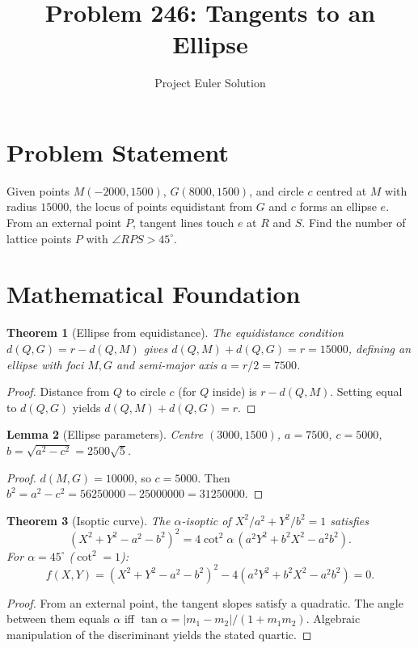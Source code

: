 \documentclass[12pt]{article}
\title{Problem 246: Tangents to an Ellipse}
\author{Project Euler Solution}
\date{}
\newtheorem{theorem}{Theorem}
\newtheorem{lemma}[theorem]{Lemma}
\begin{document}
\maketitle

\section{Problem Statement}

Given points $M(-2000,1500)$, $G(8000,1500)$, and circle $c$ centred at $M$ with radius $15000$, the locus of points equidistant from $G$ and $c$ forms an ellipse $e$. From an external point $P$, tangent lines touch $e$ at $R$ and $S$. Find the number of lattice points $P$ with $\angle RPS>45^\circ$.

\section{Mathematical Foundation}

\begin{theorem}[Ellipse from equidistance]
The equidistance condition $d(Q,G)=r-d(Q,M)$ gives $d(Q,M)+d(Q,G)=r=15000$, defining an ellipse with foci $M,G$ and semi-major axis $a=r/2=7500$.
\end{theorem}

\begin{proof}
Distance from $Q$ to circle $c$ (for $Q$ inside) is $r-d(Q,M)$. Setting equal to $d(Q,G)$ yields $d(Q,M)+d(Q,G)=r$.
\end{proof}

\begin{lemma}[Ellipse parameters]\label{lem:params}
Centre $(3000,1500)$, $a=7500$, $c=5000$, $b=\sqrt{a^2-c^2}=2500\sqrt{5}$.
\end{lemma}

\begin{proof}
$d(M,G)=10000$, so $c=5000$. Then $b^2=a^2-c^2=56250000-25000000=31250000$.
\end{proof}

\begin{theorem}[Isoptic curve]\label{thm:isoptic}
The $\alpha$-isoptic of $X^2/a^2+Y^2/b^2=1$ satisfies
\[
(X^2+Y^2-a^2-b^2)^2=4\cot^2\!\alpha\,(a^2Y^2+b^2X^2-a^2b^2).
\]
For $\alpha=45^\circ$ ($\cot^2=1$):
\[
f(X,Y)=(X^2+Y^2-a^2-b^2)^2-4(a^2Y^2+b^2X^2-a^2b^2)=0.
\]
\end{theorem}

\begin{proof}
From an external point, the tangent slopes satisfy a quadratic. The angle between them equals $\alpha$ iff $\tan\alpha=|m_1-m_2|/(1+m_1m_2)$. Algebraic manipulation of the discriminant yields the stated quartic.
\end{proof}
\end{document}
